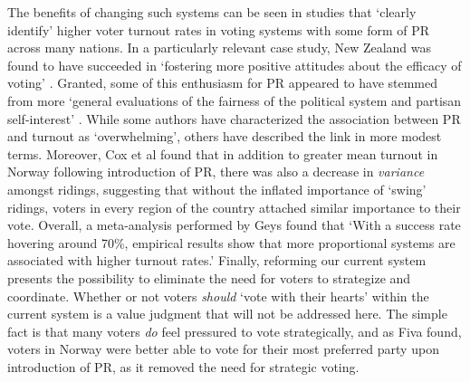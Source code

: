

The benefits of changing such systems can be seen in studies that `clearly identify' higher voter turnout rates in voting systems with some form of PR\citep{Blais_1990} across many nations.
In a particularly relevant case study, New Zealand was found to have succeeded in `fostering more positive attitudes about the efficacy of voting' \citep{Karp_Banducci}. Granted, some of this enthusiasm for PR appeared to have stemmed from more `general evaluations of the fairness of the political system and partisan self-interest' \citep{Banducci_Karp}.
While some authors have characterized the association between PR and turnout as `overwhelming'\citep{Selb}, others have described the link in more modest terms.
Moreover, Cox et al found that in addition to greater mean turnout in Norway following introduction of PR, there was also a decrease in \emph{variance} amongst ridings, suggesting that without the inflated importance of `swing' ridings, voters in every region of the country attached similar importance to their vote\citep{Cox_2016}.
Overall, a meta-analysis performed by Geys\citep{Geys_2006} found that `With a success rate hovering around 70\%, empirical results show that more proportional systems are associated with higher turnout rates.'
Finally, reforming our current system presents the possibility to eliminate the need for voters to strategize and coordinate. Whether or not voters \emph{should} `vote with their hearts' within the current system is a value judgment that will not be addressed here. The simple fact is that many voters \emph{do} feel pressured to vote strategically, and as Fiva found, voters in Norway were better able to vote for their most preferred party upon introduction of PR, as it removed the need for strategic voting\citep{Fiva}.

